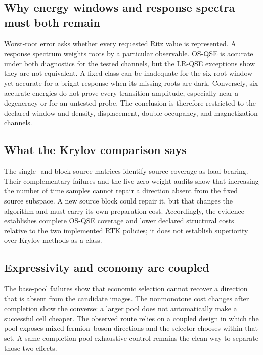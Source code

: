 \documentclass[
  reprint,
  amsmath,
  amssymb,
  aps,
  pra,
  nofootinbib,
  superscriptaddress,
  floatfix
]{revtex4-2}
\begin{document}
\subsection{Why energy windows and response spectra must both remain}

Worst-root error asks whether every requested Ritz value is represented.
A response spectrum weights roots by a particular observable.  OS-QSE is
accurate under both diagnostics for the tested channels, but the LR-QSE
exceptions show they are not equivalent.  A fixed class can be inadequate
for the six-root window yet accurate for a bright response when its missing
roots are dark.  Conversely, six accurate energies do not prove every
transition amplitude, especially near a degeneracy or for an untested probe.
The conclusion is therefore restricted to the declared window and density,
displacement, double-occupancy, and magnetization channels.

\subsection{What the Krylov comparison says}

The single- and block-source matrices identify source coverage as
load-bearing.  Their complementary failures and the five zero-weight audits
show that increasing the number of time samples cannot repair a direction
absent from the fixed source subspace.  A new source block could repair it,
but that changes the algorithm and must carry its own preparation cost.
Accordingly, the evidence establishes complete OS-QSE coverage and lower
declared structural costs relative to the two implemented RTK policies; it
does not establish superiority over Krylov methods as a class.

\subsection{Expressivity and economy are coupled}

The base-pool failures show that economic selection cannot recover a direction
that is absent from the candidate images.  The nonmonotone cost changes after
completion show the converse: a larger pool does not automatically make a
successful cell cheaper.  The observed route relies on a coupled design in
which the pool exposes mixed fermion--boson directions and the selector chooses
within that set.  A same-completion-pool exhaustive control remains the clean
way to separate those two effects.
\end{document}
